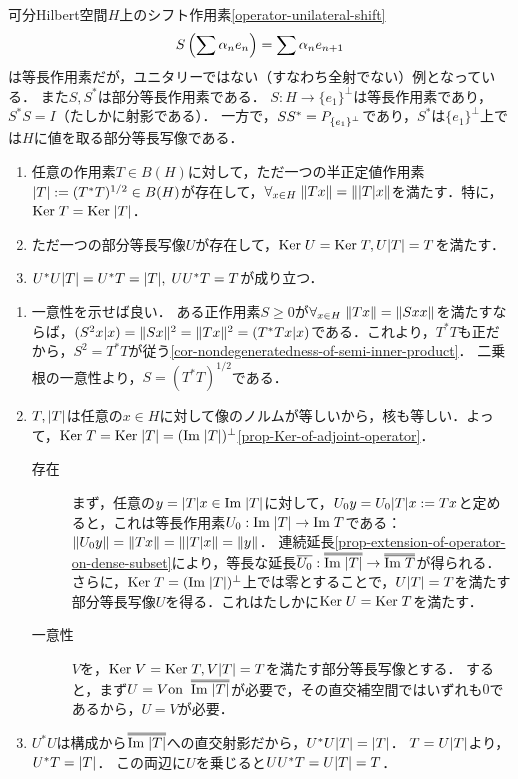 \documentclass[uplatex,dvipdfmx]{jsreport}
\begin{document}
\begin{example}
    可分Hilbert空間$H$上のシフト作用素\ref{operator-unilateral-shift}
    \[S\left(\sum\alpha_ne_n\right)=\sum\alpha_ne_{n+1}\]
    は等長作用素だが，ユニタリーではない（すなわち全射でない）例となっている．
    また$S,S^*$は部分等長作用素である．
    $S:H\to\{e_1\}^\perp$は等長作用素であり，$S^*S=I$（たしかに射影である）．
    一方で，$SS^*=P_{\left\{e_1\right\}^\perp}$であり，$S^*$は$\{e_1\}^\perp$上では$H$に値を取る部分等長写像である．
\end{example}

\begin{theorem}\mbox{}\label{thm-polar-decomposition}
    \begin{enumerate}
        \item 任意の作用素$T\in B(H)$に対して，ただ一つの半正定値作用素$\lvert T\rvert:=(T^*T)^{1/2}\in B(H)$が存在して，$\forall_{x\in H}\;\|Tx\|=\|\lvert T\rvert x\|$を満たす．特に，$\mathrm{Ker}\; T=\mathrm{Ker}\;\lvert T\rvert$．
        \item ただ一つの部分等長写像$U$が存在して，$\mathrm{Ker}\; U=\mathrm{Ker}\; T,U\lvert T\rvert=T$を満たす．
        \item $U^*U\lvert T\rvert=U^*T=\lvert T\rvert,\;UU^*T=T$が成り立つ．
    \end{enumerate}
\end{theorem}
\begin{Proof}\mbox{}
    \begin{enumerate}
        \item 一意性を示せば良い．
        ある正作用素$S\ge0$が$\forall_{x\in H}\;\|Tx\|=\|Sxx\|$を満たすならば，$(S^2x|x)=\|Sx\|^2=\|Tx\|^2=(T^*Tx|x)$である．これより，$T^*T$も正だから，$S^2=T^*T$が従う\ref{cor-nondegeneratedness-of-semi-inner-product}．
        二乗根の一意性より，$S=(T^*T)^{1/2}$である．
        \item $T,\lvert T\rvert$は任意の$x\in H$に対して像のノルムが等しいから，核も等しい．よって，$\mathrm{Ker}\; T=\mathrm{Ker}\;\lvert T\rvert=(\mathrm{Im}\;\lvert T\rvert)^\perp$\ref{prop-Ker-of-adjoint-operator}．
        \begin{description}
            \item[存在] まず，任意の$y=\lvert T\rvert x\in\mathrm{Im}\;\lvert T\rvert$に対して，$U_0y=U_0\lvert T\rvert x:=Tx$と定めると，これは等長作用素$U_0:\mathrm{Im}\;\lvert T\rvert\to\mathrm{Im}\; T$である：$\|U_0y\|=\|Tx\|=\|\lvert T\rvert x\|=\|y\|$．
            連続延長\ref{prop-extension-of-operator-on-dense-subset}により，等長な延長$\o{U_0}:\oo{\Im\abs{T}}\to\oo{\Im T}$が得られる．
            さらに，$\mathrm{Ker}\; T=(\mathrm{Im}\;\lvert T\rvert)^\perp$上では零とすることで，$U\lvert T\rvert=T$を満たす部分等長写像$U$を得る．これはたしかに$\mathrm{Ker}\; U=\mathrm{Ker}\; T$を満たす．
            \item[一意性] 
            $V$を，$\mathrm{Ker}\; V=\mathrm{Ker}\; T,V\lvert T\rvert=T$を満たす部分等長写像とする．
            すると，まず$U=V\on\;\oo{\Im\abs{T}}$が必要で，その直交補空間ではいずれも$0$であるから，$U=V$が必要．
        \end{description}
        \item $U^*U$は構成から$\oo{\Im\abs{T}}$への直交射影だから，$U^*U\lvert T\rvert=\lvert T\rvert$．
        $T=U\lvert T\rvert$より，$U^*T=\lvert T\rvert$．
        この両辺に$U$を乗じると$UU^*T=U\lvert T\rvert=T$．
    \end{enumerate}
\end{Proof}
\end{document}
